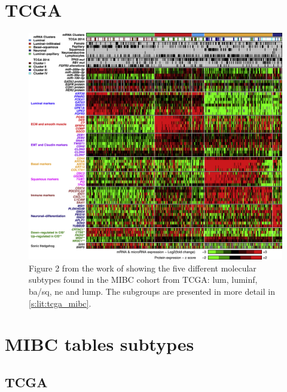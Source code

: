 \section{TCGA}

\begin{figure}[!htb]    
    \centering
\includegraphics[width=1.0\textwidth,keepaspectratio]{Sections/Lit_review/Resources/TCGA_2017_subtypes.jpg}
    \caption{Figure 2 from the work of \citet{Robertson2017-mg} showing the five different molecular subtypes found in the MIBC cohort from TCGA: \acrfull{lum}, \acrfull{luminf}, \acrfull{ba/sq}, \acrfull{ne} and \acrfull{lump}. The subgroups are presented in more detail in \cref{s:lit:tcga_mibc}. }
    \label{fig:ap:tcga_subtypes}
\end{figure}

\newpage
\section{MIBC tables subtypes}

\subsection{TCGA}

